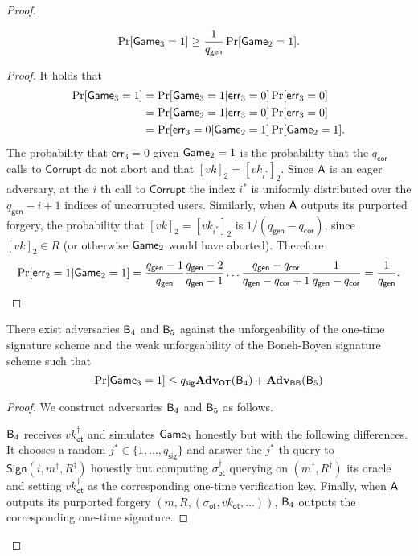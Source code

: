 \begin{proof}
\begin{lemma}
$$
\Pr[\mathsf{Game}_3=1]\geq \frac{1}{{q_\mathsf{gen}}}\Pr[\mathsf{Game}_2=1].
$$
\end{lemma}
\begin{proof}
It holds that
\begin{align*}
\Pr[\mathsf{Game}_3=1] &= \Pr[\mathsf{Game}_3=1|\mathsf{err}_3=0]\Pr[\mathsf{err}_3=0]\\
&=\Pr[\mathsf{Game}_2=1|\mathsf{err}_3=0]\Pr[\mathsf{err}_3=0]\\
&=\Pr[\mathsf{err}_3=0|\mathsf{Game}_2=1]\Pr[\mathsf{Game}_2=1].
\end{align*}
The probability that $\mathsf{err}_3=0$ given $\mathsf{Game}_2=1$ is the probability that the ${q_\mathsf{cor}}$ calls to $\mathsf{Corrupt}$ do not abort and that $[vk]_2=[vk_{i^*}]_2$. Since $\mathsf{A}$ is an eager adversary, at the $i$ th call to $\mathsf{Corrupt}$ the index $i^*$ is uniformly distributed over the ${q_\mathsf{gen}}-i+1$ indices of uncorrupted users. Similarly, when $\mathsf{A}$ outputs its purported forgery, the probability that $[vk]_2=[vk_{i^*}]_2$ is $1/({q_\mathsf{gen}}-{q_\mathsf{cor}})$, since $[vk]_2\in R$ (or otherwise $\mathsf{Game}_2$ would have aborted). Therefore
$$
\Pr[\mathsf{err}_2=1|\mathsf{Game}_2=1]=\frac{{q_\mathsf{gen}}-1}{{q_\mathsf{gen}}}\frac{{q_\mathsf{gen}}-2}{{q_\mathsf{gen}}-1}\ldots\frac{{q_\mathsf{gen}}-{q_\mathsf{cor}}}{{q_\mathsf{gen}}-{q_\mathsf{cor}}+1}\frac{1}{{q_\mathsf{gen}}-{q_\mathsf{cor}}}=\frac{1}{{q_\mathsf{gen}}}.
$$ 
\end{proof}

\begin{lemma}  There exist adversaries $\mathsf{B}_4$ and $\mathsf{B}_5$ against the unforgeability of the one-time signature scheme and the weak unforgeability of the Boneh-Boyen signature scheme such that
$$
\Pr[\mathsf{Game}_3=1]\leq q_\mathsf{sig}\mathbf{Adv}_{\mathsf{OT}}(\mathsf{B}_4)+\mathbf{Adv}_{\mathsf{BB}}(\mathsf{B}_5)
$$
\end{lemma}
\begin{proof}
We construct adversaries $\mathsf{B}_4$ and $\mathsf{B}_5$ as follows.

$\mathsf{B}_4$ receives $vk_\mathsf{ot}^\dag$ and simulates $\mathsf{Game}_3$ honestly but with the following differences. It chooses a random $j^*\in\{1,\ldots, q_\mathsf{sig}\}$ and answer the $j^*$ th query to $\mathsf{Sign}(i,m^\dag,R^\dag)$ honestly but computing $\sigma_\mathsf{ot}^\dag$ querying on $(m^\dag,R^\dag)$ its oracle and setting $vk_\mathsf{ot}^\dag$ as the corresponding one-time verification key. Finally, when $\mathsf{A}$ outputs its purported forgery $(m,R,(\sigma_\mathsf{ot},vk_\mathsf{ot},\ldots))$, $\mathsf{B}_4$ outputs the corresponding one-time signature.


\end{proof}
\end{proof}
